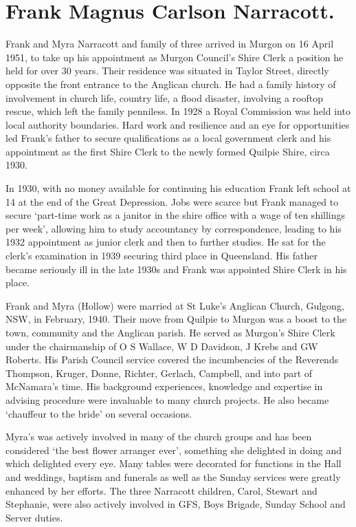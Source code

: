 \hypertarget{frank-magnus-carlson-narracott.}{%
\section{Frank Magnus Carlson Narracott.}\label{frank-magnus-carlson-narracott.}}

Frank and Myra Narracott and family of three arrived in Murgon on 16 April 1951, to take up his appointment as Murgon Council's Shire Clerk a position he held for over 30 years. Their residence was situated in Taylor Street, directly opposite the front entrance to the Anglican church. He had a family history of involvement in church life, country life, a flood disaster, involving a rooftop rescue, which left the family penniless. In 1928 a Royal Commission was held into local authority boundaries. Hard work and resilience and an eye for opportunities led Frank's father to secure qualifications as a local government clerk and his appointment as the first Shire Clerk to the newly formed Quilpie Shire, circa 1930.

In 1930, with no money available for continuing his education Frank left school at 14 at the end of the Great Depression. Jobs were scarce but Frank managed to secure `part-time work as a janitor in the shire office with a wage of ten shillings per week', allowing him to study accountancy by correspondence, leading to his 1932 appointment as junior clerk and then to further studies. He sat for the clerk's examination in 1939 securing third place in Queensland. His father became seriously ill in the late 1930s and Frank was appointed Shire Clerk in his place.

Frank and Myra (Hollow) were married at St Luke's Anglican Church, Gulgong, NSW, in February, 1940. Their move from Quilpie to Murgon was a boost to the town, community and the Anglican parish. He served as Murgon's Shire Clerk under the chairmanship of O S Wallace, W D Davidson, J Krebs and GW Roberts. His Parish Council service covered the incumbencies of the Reverends Thompson, Kruger, Donne, Richter, Gerlach, Campbell, and into part of McNamara's time. His background experiences, knowledge and expertise in advising procedure were invaluable to many church projects. He also became `chauffeur to the bride' on several occasions.

Myra's was actively involved in many of the church groups and has been considered `the best flower arranger ever', something she delighted in doing and which delighted every eye. Many tables were decorated for functions in the Hall and weddings, baptism and funerals as well as the Sunday services were greatly enhanced by her efforts. The three Narracott children, Carol, Stewart and Stephanie, were also actively involved in GFS, Boys Brigade, Sunday School and Server duties.

